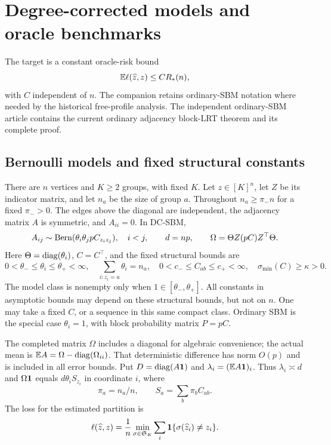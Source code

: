 \section{Degree-corrected models and oracle benchmarks}\label{sec:statements}
The target is a constant oracle-risk bound
\begin{equation}\label{eq:target}
 \mathbb E\ell(\widehat z,z)\le C R_*(n),
\end{equation}
with $C$ independent of $n$. The companion retains ordinary-SBM
notation where needed by the historical free-profile analysis.
The independent ordinary-SBM article contains the current ordinary
adjacency block-LRT theorem and its complete proof.

\subsection{Bernoulli models and fixed structural constants}

There are $n$ vertices and $K\ge2$ groups, with fixed $K$.
Let $z\in[K]^n$, let $Z$ be its indicator matrix, and let $n_a$ be the size
of group $a$. Throughout $n_a\ge\pi_-n$ for a fixed $\pi_->0$.
The edges above the diagonal are independent, the adjacency matrix $A$ is
symmetric, and $A_{ii}=0$. In DC-SBM,
\begin{equation}\label{eq:mean-model}
 A_{ij}\sim\operatorname{Bern}(\theta_i\theta_j p C_{z_i z_j}),\quad i<j,
 \qquad d=np,\qquad
 \Omega=\Theta Z(pC)Z^\top\Theta.
\end{equation}
Here $\Theta=\operatorname{diag}(\theta_i)$, $C=C^\top$, and the fixed structural bounds are
\begin{equation}\label{eq:structural}
 0<\theta_-\le\theta_i\le\theta_+<\infty,\quad
 \sum_{i:z_i=a}\theta_i=n_a,\quad
 0<c_-\le C_{ab}\le c_+<\infty,\quad
 \sigma_{\min}(C)\ge\kappa>0.
\end{equation}
The model class is nonempty only when $1\in[\theta_-,\theta_+]$.
All constants in asymptotic bounds may depend on these structural bounds,
but not on $n$. One may take a fixed $C$, or a sequence in this same compact
class. Ordinary SBM is the special case $\theta_i=1$, with block probability
matrix $P=pC$.

The completed matrix $\Omega$ includes a diagonal for algebraic convenience;
the actual mean is $\mathbb E A=\Omega-\operatorname{diag}(\Omega_{ii})$.
That deterministic difference has norm $O(p)$ and is included in all error
bounds. Put $D=\operatorname{diag}(A\mathbf 1)$ and
$\lambda_i=(\mathbb E A\mathbf 1)_i$. Thus $\lambda_i\asymp d$ and
$\Omega\mathbf 1$ equals $d\theta_i S_{z_i}$ in coordinate $i$, where
\begin{equation}\label{eq:exposures}
 \pi_a=n_a/n,\qquad S_a=\sum_b\pi_b C_{ab}.
\end{equation}
The loss for the estimated partition is
\[
 \ell(\widehat z,z)=\frac1n\min_{\sigma\in\mathfrak S_K}
 \sum_i\mathbf1\{\sigma(\widehat z_i)\ne z_i\}.
\]

